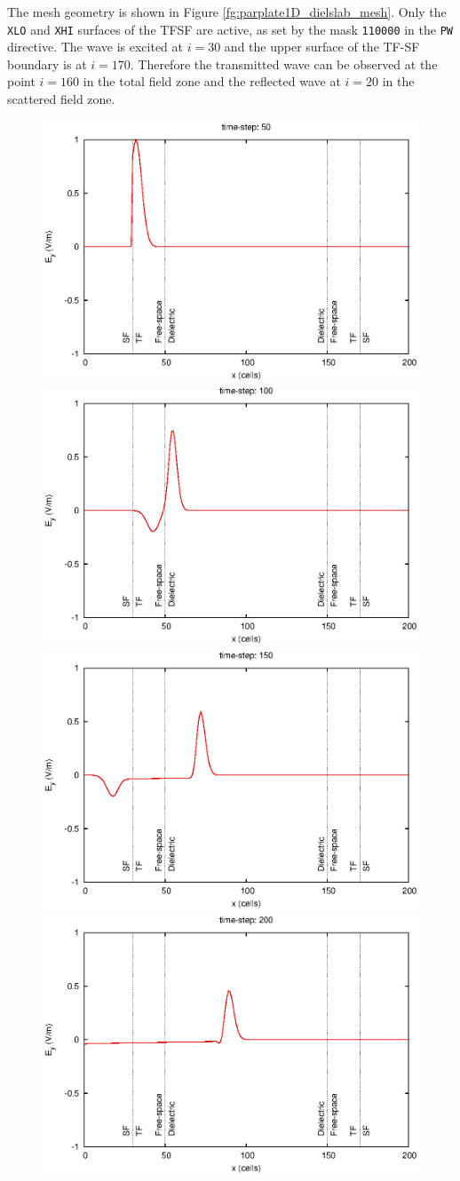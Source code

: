 \documentclass[onecolumn,a4paper]{article}
\numberwithin{equation}{section}
\begin{document}
The mesh geometry is shown in Figure \ref{fg:parplate1D_dielslab_mesh}. Only the \texttt{XLO} and \texttt{XHI} 
surfaces of the TFSF are active, as set by the mask \texttt{110000} in the \texttt{PW} directive. 
The wave is excited at $i=30$ and the upper surface of the TF-SF boundary is at $i=170$.  
Therefore the transmitted wave can be observed at the point $i=160$ in the total field zone 
and the reflected wave at $i=20$ in the scattered field zone. 

\begin{figure}[ht!]
\begin{center}
  \includegraphics[width=0.49\linewidth]{figures/parplate1D_dielslab-frame000050}
  \includegraphics[width=0.49\linewidth]{figures/parplate1D_dielslab-frame000100}
  \includegraphics[width=0.49\linewidth]{figures/parplate1D_dielslab-frame000150}
  \includegraphics[width=0.49\linewidth]{figures/parplate1D_dielslab-frame000200}

\end{center}
\end{figure}
\end{document}

